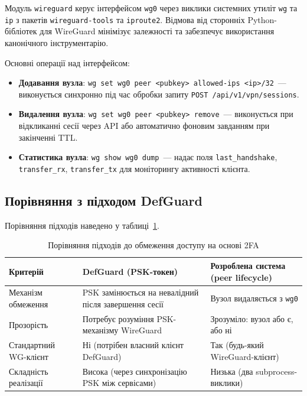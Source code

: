 Модуль \texttt{wireguard} керує інтерфейсом \texttt{wg0} через виклики
системних утиліт \texttt{wg} та \texttt{ip} з пакетів \texttt{wireguard-tools}
та \texttt{iproute2}. Відмова від сторонніх Python-бібліотек для WireGuard мінімізує
залежності та забезпечує використання канонічного інструментарію.

Основні операції над інтерфейсом:

\begin{itemize}
  \item \textbf{Додавання вузла}: \texttt{wg set wg0 peer <pubkey>
    allowed-ips <ip>/32}~--- виконується синхронно під час обробки
    запиту \texttt{POST /api/v1/vpn/sessions}.

  \item \textbf{Видалення вузла}: \texttt{wg set wg0 peer <pubkey>
    remove}~--- виконується при відкликанні сесії через API
    або автоматично фоновим завданням при закінченні TTL.

  \item \textbf{Статистика вузла}: \texttt{wg show wg0 dump}~---
    надає поля \texttt{last\_handshake}, \texttt{transfer\_rx},
    \texttt{transfer\_tx} для моніторингу активності клієнта.
\end{itemize}

\subsection{Порівняння з підходом DefGuard}

Порівняння підходів наведено у таблиці~\ref{tab:wg_approach}.

\begin{table}[htbp]
\caption{Порівняння підходів до обмеження доступу на основі 2FA}
\label{tab:wg_approach}
\begin{tabularx}{\textwidth}{|l|X|X|}
\hline
\textbf{Критерій} & \textbf{DefGuard (PSK-токен)} & \textbf{Розроблена система (peer lifecycle)} \\
\hline
Механізм обмеження & PSK замінюється на невалідний після завершення сесії & Вузол видаляється з \texttt{wg0} \\
\hline
Прозорість & Потребує розуміння PSK-механізму WireGuard & Зрозуміло: вузол або є, або ні \\
\hline
Стандартний WG-клієнт & Ні (потрібен власний клієнт DefGuard) & Так (будь-який WireGuard-клієнт) \\
\hline
Складність реалізації & Висока (через синхронізацію PSK між сервісами) & Низька (два subprocess-виклики) \\
\hline
\end{tabularx}
\end{table}

